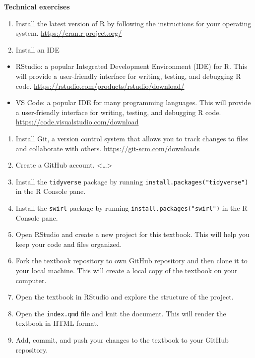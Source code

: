 \documentclass[
  letterpaper,
]{latex/krantz}
\providecommand{\tightlist}{%
  \setlength{\itemsep}{0pt}\setlength{\parskip}{0pt}}\usepackage{longtable,booktabs,array}
\begin{document}
\begin{tcolorbox}[enhanced jigsaw, arc=.35mm, leftrule=.75mm, rightrule=.15mm, opacityback=0, colback=white, breakable, bottomrule=.15mm, left=2mm, toprule=.15mm]

\textbf{Technical exercises}

\begin{enumerate}
\def\labelenumi{\arabic{enumi}.}
\tightlist
\item
  Install the latest version of R by following the instructions for your
  operating system. \url{https://cran.r-project.org/}
\item
  Install an IDE
\end{enumerate}

\begin{itemize}
\tightlist
\item
  RStudio: a popular Integrated Development Environment (IDE) for R.
  This will provide a user-friendly interface for writing, testing, and
  debugging R code. \url{https://rstudio.com/products/rstudio/download/}
\item
  VS Code: a popular IDE for many programming languages. This will
  provide a user-friendly interface for writing, testing, and debugging
  R code. \url{https://code.visualstudio.com/download}
\end{itemize}

\begin{enumerate}
\def\labelenumi{\arabic{enumi}.}
\setcounter{enumi}{2}
\tightlist
\item
  Install Git, a version control system that allows you to track changes
  to files and collaborate with others.
  \url{https://git-scm.com/downloads}
\item
  Create a GitHub account. \textless\ldots\textgreater{}
\item
  Install the \texttt{tidyverse} package by running
  \texttt{install.packages("tidyverse")} in the R Console pane.
\item
  Install the \texttt{swirl} package by running
  \texttt{install.packages("swirl")} in the R Console pane.
\item
  Open RStudio and create a new project for this textbook. This will
  help you keep your code and files organized.
\item
  Fork the textbook repository to own GitHub repository and then clone
  it to your local machine. This will create a local copy of the
  textbook on your computer.
\item
  Open the textbook in RStudio and explore the structure of the project.
\item
  Open the \texttt{index.qmd} file and knit the document. This will
  render the textbook in HTML format.
\item
  Add, commit, and push your changes to the textbook to your GitHub
  repository.
\end{enumerate}

\end{tcolorbox}
\end{document}
